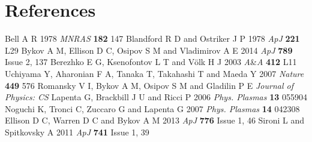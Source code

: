 \section*{References}
\begin{thebibliography}{20}
 Bell A R 1978 \textit{MNRAS} \textbf{182} 147
 Blandford R D and Ostriker J P 1978 \textit{ApJ} \textbf{221} L29 
 Bykov A M, Ellison D C, Osipov S M and Vladimirov A E 2014 \textit{ApJ} \textbf{789} Issue 2, 137
 Berezhko E G, Ksenofontov L T and V{\"o}lk H J  2003 \textit{A}{\&}\textit{A} \textbf{412} L11
 Uchiyama Y, Aharonian F A, Tanaka T, Takahashi T and Maeda Y 2007 \textit{Nature} \textbf{449} 576
 Romansky V I, Bykov A M, Osipov S M and Gladilin P E \textit{Journal of Physics: CS}
 Lapenta G, Brackbill J U and Ricci P 2006 \textit{Phys. Plasmas} \textbf{13} 055904
 Noguchi K, Tronci C, Zuccaro G and Lapenta G 2007 \textit{Phys. Plasmas} \textbf{14} 042308
 Ellison D C, Warren D C and Bykov A M 2013 \textit{ApJ} \textbf{776} Issue 1, 46
 Sironi L and Spitkovsky A 2011 \textit{ApJ} \textbf{741} Issue 1, 39
\end{thebibliography}